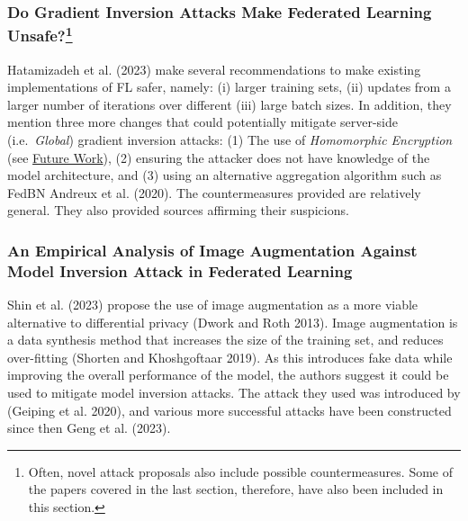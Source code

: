 \documentclass[
  compsoc]{IEEEtran}
\begin{document}
\hypertarget{do-gradient-inversion-attacks-make-federated-learning-unsafe1}{%
\subsubsection[Do Gradient Inversion Attacks Make Federated Learning
Unsafe?]{\texorpdfstring{Do Gradient Inversion Attacks Make Federated
Learning
Unsafe?\footnote{Often, novel attack proposals also include possible
  countermeasures. Some of the papers covered in the last section,
  therefore, have also been included in this section.}}{Do Gradient Inversion Attacks Make Federated Learning Unsafe?}}\label{do-gradient-inversion-attacks-make-federated-learning-unsafe1}}

Hatamizadeh et al. (2023) make several recommendations to make existing
implementations of FL safer, namely: (i) larger training sets, (ii)
updates from a larger number of iterations over different (iii) large
batch sizes. In addition, they mention three more changes that could
potentially mitigate server-side (i.e.~\emph{Global}) gradient inversion
attacks: (1) The use of \emph{Homomorphic Encryption} (see
\protect\hyperlink{future-work}{Future Work}), (2) ensuring the attacker
does not have knowledge of the model architecture, and (3) using an
alternative aggregation algorithm such as FedBN Andreux et al. (2020).
The countermeasures provided are relatively general. They also provided
sources affirming their suspicions.

\hypertarget{an-empirical-analysis-of-image-augmentation-against-model-inversion-attack-in-federated-learning}{%
\subsubsection{An Empirical Analysis of Image Augmentation Against Model
Inversion Attack in Federated
Learning}\label{an-empirical-analysis-of-image-augmentation-against-model-inversion-attack-in-federated-learning}}

Shin et al. (2023) propose the use of image augmentation as a more
viable alternative to differential privacy (Dwork and Roth 2013). Image
augmentation is a data synthesis method that increases the size of the
training set, and reduces over-fitting (Shorten and Khoshgoftaar 2019).
As this introduces fake data while improving the overall performance of
the model, the authors suggest it could be used to mitigate model
inversion attacks. The attack they used was introduced by (Geiping et
al. 2020), and various more successful attacks have been constructed
since then Geng et al. (2023).
\end{document}
